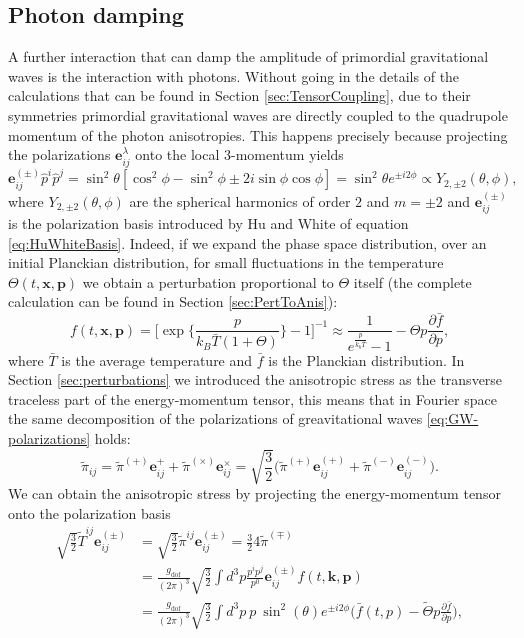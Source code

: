 \subsection{Photon damping}
\label{sec:photon_damping}
A further interaction that can damp the amplitude of primordial gravitational waves is the interaction with photons. Without going in the details of the calculations that can be found in Section \ref{sec:TensorCoupling}, due to their symmetries primordial gravitational waves are directly coupled to the quadrupole momentum of the photon anisotropies. This happens precisely because projecting the polarizations $\mathbf{e}_{ij}^\lambda$ onto the local 3-momentum yields
$$\mathbf{e}_{ij}^{(\pm)}\hat p^i\hat p^j=\sin^2\theta[\cos^2\phi-\sin^2\phi\pm2i\sin\phi\cos\phi]=\sin^2\theta e^{\pm i2\phi}\propto Y_{2,\pm2}(\theta,\phi),$$
where $Y_{2,\pm2}(\theta,\phi)$ are the spherical harmonics of order $2$ and $m=\pm2$ and $\mathbf{e}_{ij}^{(\pm)}$ is the polarization basis introduced by Hu and White \cite{HuWhite} of equation \eqref{eq:HuWhiteBasis}. Indeed, if we expand the phase space distribution, over an initial Planckian distribution, for small fluctuations in the temperature $\Theta(t,\mathbf x,\mathbf p)$ we obtain a perturbation proportional to $\Theta$ itself (the complete calculation can be found in Section \ref{sec:PertToAnis}):
$$
f(t,\mathbf x,\mathbf p)=\bigg[\exp\bigg\{\frac{p}{k_B\bar T(1+\Theta)}\bigg\}-1\bigg]^{-1}\approx \frac{1}{e^{\frac{p}{k_b\bar T}}-1}-\Theta p\frac{\partial \bar f}{\partial p},
$$ 
where $\bar T$ is the average temperature and $\bar f$ is the Planckian distribution. In Section \ref{sec:perturbations} we introduced the anisotropic stress as the transverse traceless part of the energy-momentum tensor, this means that in Fourier space the same decomposition of the polarizations of greavitational waves \eqref{eq:GW-polarizations} holds:
$$\tilde \pi_{ij}=\tilde\pi^{(+)}\boldsymbol e_{ij}^++\tilde\pi^{(\times)}\boldsymbol e_{ij}^\times=\sqrt{\frac{3}{2}} \big(\tilde\pi^{(+)}\mathbf{e}^{(+)}_{ij}+\tilde\pi^{(-)}\mathbf{e}^{(-)}_{ij}\big).$$
We can obtain the anisotropic stress by projecting the energy-momentum tensor onto the polarization basis
\begin{align*}
    \sqrt{\frac32}\tilde T^{ij}\boldsymbol{e}_{ij}^{(\pm)}&=\sqrt{\frac32}\tilde \pi^{ij}\boldsymbol{e}_{ij}^{(\pm)}=\frac{3}{2}4\tilde\pi^{(\mp)}\\
    &=\frac{g_\text{dof}}{(2\pi)^3}\sqrt{\frac32}\int d^3p \frac{p^ip^j}{p^0}\boldsymbol{e}_{ij}^{(\pm)}f(t,\mathbf k,\mathbf p)\\&=\frac{g_\text{dof}}{(2\pi)^3}\sqrt{\frac32}\int d^3p\ p\ \sin^2(\theta)e^{\pm i2\phi}\bigg(\bar f(t,p)-\tilde\Theta p\frac{\partial\bar f}{\partial p}\bigg),
\end{align*}
